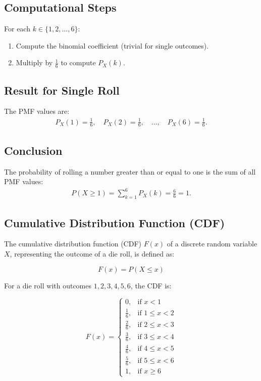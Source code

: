 \documentclass[journal]{IEEEtran}
\begin{document}
	\subsection*{Computational Steps}
	For each \(k \in \{1, 2, \dots, 6\}\):
	\begin{enumerate}
		\item Compute the binomial coefficient (trivial for single outcomes).
		\item Multiply by \(\frac{1}{6}\) to compute \(P_X(k)\).
	\end{enumerate}
	
	\subsection*{Result for Single Roll}
	The PMF values are:
	\begin{align}
		P_X(1) = \frac{1}{6}, \quad P_X(2) = \frac{1}{6}, \quad \dots, \quad P_X(6) = \frac{1}{6}.
	\end{align}
	
	\subsection*{Conclusion}
	The probability of rolling a number greater than or equal to one is the sum of all PMF values:
	\begin{align}
		P(X \geq 1) = \sum_{k=1}^{6} P_X(k) = \frac{6}{6} = 1.
	\end{align}
	\subsection*{Cumulative Distribution Function (CDF)}
	
	The cumulative distribution function (CDF) \(F(x)\) of a discrete random variable \(X\), representing the outcome of a die roll, is defined as:
	
	\[
	F(x) = P(X \leq x)
	\]
	
	For a die roll with outcomes \(1, 2, 3, 4, 5, 6\), the CDF is:
	
	\[
	F(x) =
	\begin{cases}
		0, & \text{if } x < 1 \\
		\frac{1}{6}, & \text{if } 1 \leq x < 2 \\
		\frac{2}{6}, & \text{if } 2 \leq x < 3 \\
		\frac{3}{6}, & \text{if } 3 \leq x < 4 \\
		\frac{4}{6}, & \text{if } 4 \leq x < 5 \\
		\frac{5}{6}, & \text{if } 5 \leq x < 6 \\
		1, & \text{if } x \geq 6
	\end{cases}
	\]
	
\end{document}
